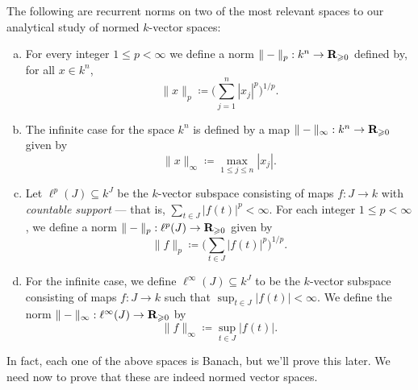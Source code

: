 \begin{example}[\(p\)-norms]
\label{exp:p-norms}
The following are recurrent norms on two of the most relevant spaces to our
analytical study of normed \(k\)-vector spaces:
\begin{enumerate}[(a)]\setlength\itemsep{0em}
\item For every integer \(1 \leq p < \infty\) we define a norm \(\| - \|_p: k^n
\to \mathbf{R}_{\geqslant 0}\) defined by, for all \(x \in k^n\),
\[
\| x \|_p \coloneq \bigg( \sum_{j=1}^n |x_j|^p \bigg)^{1/p}.
\]

\item The infinite case for the space \(k^n\) is defined by a map
\(\| - \|_{\infty}: k^n \to \mathbf{R}_{\geqslant 0}\) given by
\[
\| x \|_{\infty} \coloneq \max_{1 \leq j \leq n} |x_j|.
\]

\item Let \(\ell^p(J) \subseteq k^J\) be the \(k\)-vector subspace consisting of
maps \(f: J \to k\) with \emph{countable support} --- that is, \(\sum_{t \in J}
|f(t)|^p < \infty\). For each integer \(1 \leq p < \infty\), we define a norm
\(\| - \|_p: \ell^p(J) \to \mathbf{R}_{\geqslant 0}\) given by
\[
\| f \|_p \coloneq \bigg( \sum_{t \in J} |f(t)|^p \bigg)^{1/p}.
\]

\item For the infinite case, we define \(\ell^{\infty}(J) \subseteq k^{J}\) to
be the \(k\)-vector subspace consisting of maps \(f: J \to k\) such that
\(\sup_{t \in J} |f(t)| < \infty\). We define the norm \(\| - \|_{\infty}:
\ell^{\infty}(J) \to \mathbf{R}_{\geqslant 0}\) by
\[
\| f \|_{\infty} \coloneq \sup_{t \in J} |f(t)|.
\]
\end{enumerate}
In fact, each one of the above spaces is Banach, but we'll prove this later.
We need now to prove that these are indeed normed vector spaces.
\end{example}

